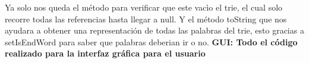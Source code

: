 \documentclass{article}
\begin{document}
		
		Ya solo nos queda el método para verificar que este vacìo el trie, el cual solo recorre todas las referencias hasta llegar a null.
		Y el método toString que nos ayudara a obtener una representación de todas las palabras del trie, esto gracias a setIsEndWord para saber
		que palabras deberian ir o no.
		\textbf{GUI: Todo el código realizado para la interfaz gráfica para el usuario}
		
		
		
		
		
\end{document}
